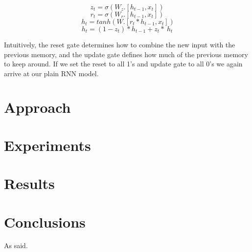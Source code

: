 \documentclass[runningheads]{llncs}
\begin{document}
\[z_t = \sigma(W_z.[h_{t-1},x_t]) \]
\[r_t = \sigma(W_r.[h_{t-1},x_t]) \]
\[~h_t = tanh(W.[r_t * h_{t-1},x_t]) \]
\[h_t = (1-z_t) * h_{t-1} + z_t * ~h_t \]

Intuitively, the reset gate determines how to combine the new input with the previous memory, and the update gate defines how much of the previous memory to keep around. If we set the reset to all 1’s and  update gate to all 0’s we again arrive at our plain RNN model.

\section{Approach}

\section{Experiments}


\section{Results}
\section{Conclusions}


As \cite{Alpher04} said.



\end{document}
